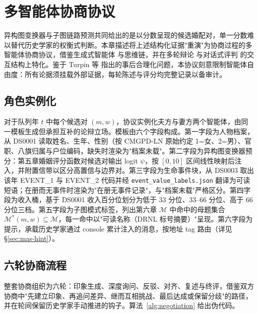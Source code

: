 \chapter{多智能体协商协议}\label{chap:mas}

异构图变换器与子图链路预测共同给出的是以分数呈现的候选婚配对，单一分数难以替代历史学家的权衡式判断。本章描述将上述结构化证据"重演"为协商过程的多智能体协商协议，借鉴生成式智能体\citep{park2023generative} 与思维链\citep{wei2022cot}，并在多轮辩论\citep{liang2023llm} 与对话式评判\citep{chan2023chateval} 的交互结构上特化。鉴于 Turpin 等\citep{turpin2023faithfulness} 指出的事后合理化问题，本协议刻意限制智能体自由度：所有论据须挂载外部证据，每轮陈述与评分均完整记录以备审计。

\section{角色实例化}\label{sec:mas-persona}

对于队列年 \(t\) 中每个候选对 \((m,w)\)，协议实例化夫方与妻方两个智能体，由同一模板生成但承担互补的论辩立场。模板由六个字段构成。第一字段为人物档案，从 DS0001 读取姓名、生年、性别（按 CMGPD-LN 原始约定 1=女、2=男）、官职、八旗归属与户位编码，缺失时渲染为"档案未载"。第二字段为异构图变换器预分：第五章婚姻评分函数对候选对输出 logit \(\psi\)，按 \([0,10]\) 区间线性映射后注入，并附置信带以区分高置信与边界对。第三字段为生命事件块，从 DS0003 取出该年 EVENT\_1 与 EVENT\_2 代码并经 \texttt{event\_value\_labels.json} 翻译为可读短语；在册而无事件时渲染为"在册无事件记录"，与"档案未载"严格区分。第四字段为收入桶，基于 DS0001 收入百分位划分为低于 33 分位、33–66 分位、高于 66 分位三档。第五字段为子图模式标签，列出第六章 \(\mathcal{M}\) 中命中的母题集合 \(\mathcal{M}^\ast(m,w) \subseteq \mathcal{M}\)，每一命中以"可读名称（DRNL 标号摘要）"呈现。第六字段为提示，承载历史学家通过 console 累计注入的消息，按地址 tag 路由（详见 \S\ref{sec:mas-hint}）。

\section{六轮协商流程}\label{sec:mas-rounds}

整套协商组织为六轮：印象生成、深度询问、反驳、对齐、复述与终评，借鉴双方协商中"先建立印象、再追问差异、继而互相挑战、最后达成或保留分歧"的路径，并在轮间保留历史学家手动推进的钩子。算法~\ref{alg:negotiation} 给出伪代码。

